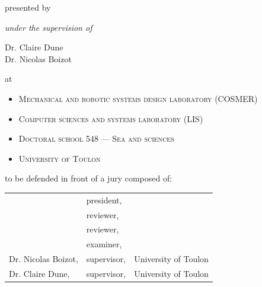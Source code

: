 \begin{center}
	\begin{minipage}[t]{0.75\textwidth}

		presented by \theauthor{}

		\begin{center}
			\textit{under the supervision of}
		\end{center}

		\begin{flushright}
			Dr. Claire Dune    \\
			Dr. Nicolas Boizot \\
		\end{flushright}
		\relax{}

		at
		\begin{itemize}[topsep=0pt,itemsep=2pt,partopsep=4pt, parsep=0pt]
			\item[]\textsc{Mechanical and robotic systems design laboratory (COSMER)}
			\item[]\textsc{Computer sciences and systems laboratory (LIS)}
			\item[]\textsc{Doctoral school 548 --- Sea and sciences}
			\item[]\textsc{University of Toulon}
		\end{itemize}
		\vspace{1cm}

		to be defended in front of a jury composed of: \vspace{.1cm}

		\begin{center}
			\begin{tabularx}{.9\linewidth}{lll}
				                    & president,  &                      \\
				                    & reviewer,   &                      \\
				                    & reviewer,   &                      \\
				                    & examiner,   &                      \\
				Dr. Nicolas Boizot, & supervisor, & University of Toulon \\
				Dr. Claire Dune,    & supervisor, & University of Toulon
			\end{tabularx}
		\end{center}
		\vspace{.1cm}

	\end{minipage}

\end{center}

\restoregeometry